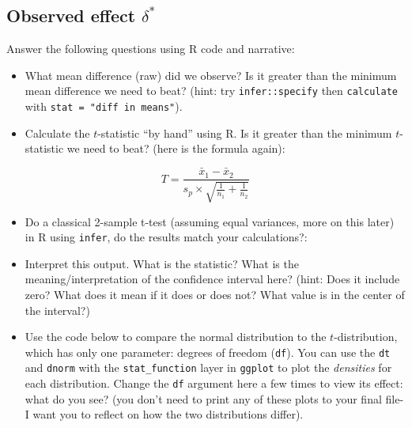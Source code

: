 \documentclass[]{article}
\newenvironment{Shaded}{\begin{snugshade}}{\end{snugshade}}
\newcommand{\KeywordTok}[1]{\textcolor[rgb]{0.13,0.29,0.53}{\textbf{#1}}}
\newcommand{\DataTypeTok}[1]{\textcolor[rgb]{0.13,0.29,0.53}{#1}}
\newcommand{\DecValTok}[1]{\textcolor[rgb]{0.00,0.00,0.81}{#1}}
\newcommand{\StringTok}[1]{\textcolor[rgb]{0.31,0.60,0.02}{#1}}
\newcommand{\OtherTok}[1]{\textcolor[rgb]{0.56,0.35,0.01}{#1}}
\newcommand{\OperatorTok}[1]{\textcolor[rgb]{0.81,0.36,0.00}{\textbf{#1}}}
\newcommand{\NormalTok}[1]{#1}
\providecommand{\tightlist}{%
  \setlength{\itemsep}{0pt}\setlength{\parskip}{0pt}}
\begin{document}
\subsection{\texorpdfstring{Observed effect
\(\delta^*\)}{Observed effect \textbackslash{}delta\^{}*}}\label{observed-effect-delta}

Answer the following questions using R code and narrative:

\begin{itemize}
\item
  What mean difference (raw) did we observe? Is it greater than the
  minimum mean difference we need to beat? (hint: try
  \texttt{infer::specify} then \texttt{calculate} with
  \texttt{stat\ =\ "diff\ in\ means"}).
\item
  Calculate the \(t\)-statistic ``by hand'' using R. Is it greater than
  the minimum \(t\)-statistic we need to beat? (here is the formula
  again):
\end{itemize}

\[{\displaystyle T={\frac {{\bar {x}}_{1}-{\bar {x}}_{2}}{s_{p}\times {\sqrt {{\frac {1}{n_{1}}}+{\frac {1}{n_{2}}}}}}}}\]

\begin{itemize}
\tightlist
\item
  Do a classical 2-sample t-test (assuming equal variances, more on this
  later) in R using \texttt{infer}, do the results match your
  calculations?:
\end{itemize}

\begin{Shaded}
\end{Shaded}

\begin{itemize}
\item
  Interpret this output. What is the statistic? What is the
  meaning/interpretation of the confidence interval here? (hint: Does it
  include zero? What does it mean if it does or does not? What value is
  in the center of the interval?)
\item
  Use the code below to compare the normal distribution to the
  \(t\)-distribution, which has only one parameter: degrees of freedom
  (\texttt{df}). You can use the \texttt{dt} and \texttt{dnorm} with the
  \texttt{stat\_function} layer in \texttt{ggplot} to plot the
  \emph{densities} for each distribution. Change the \texttt{df}
  argument here a few times to view its effect: what do you see? (you
  don't need to print any of these plots to your final file- I want you
  to reflect on how the two distributions differ).
\end{itemize}
\end{document}
